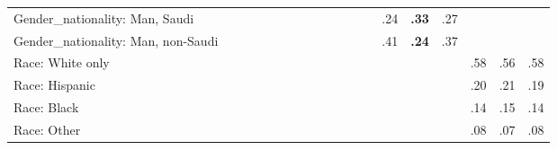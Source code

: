\begin{tabular}[t]{lcccccccccccccccccc}
Gender\_nationality: Man, Saudi &  &  &  &  &  &  &  &  &  &  &  &  & .24 & \textbf{.33} & .27 &  &  & \\
Gender\_nationality: Man, non-Saudi &  &  &  &  &  &  &  &  &  &  &  &  & .41 & \textbf{.24} & .37 &  &  & \\
\addlinespace
Race: White only &  &  &  &  &  &  &  &  &  &  &  &  &  &  &  & .58 & .56 & .58\\
Race: Hispanic &  &  &  &  &  &  &  &  &  &  &  &  &  &  &  & .20 & .21 & .19\\
Race: Black &  &  &  &  &  &  &  &  &  &  &  &  &  &  &  & .14 & .15 & .14\\
Race: Other &  &  &  &  &  &  &  &  &  &  &  &  &  &  &  & .08 & .07 & .08\\
\bottomrule
\end{tabular}